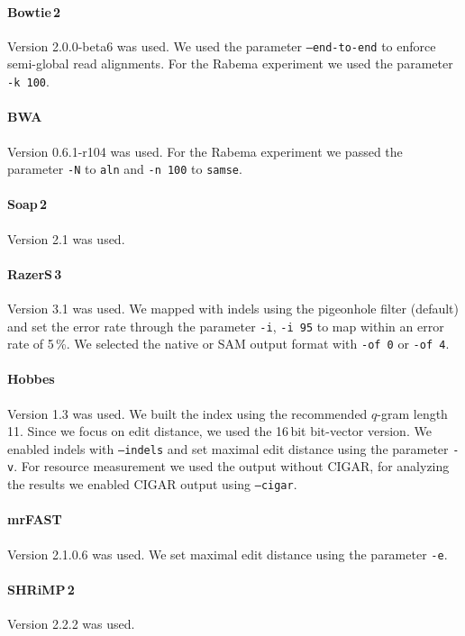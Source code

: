 \paragraph{Bowtie\,2}
Version 2.0.0-beta6 was used.
We used the parameter \texttt{--end-to-end} to enforce semi-global read alignments.
For the Rabema experiment we used the parameter \texttt{-k 100}.

\paragraph{BWA}
Version 0.6.1-r104 was used.
For the Rabema experiment we passed the parameter \texttt{-N} to \texttt{aln} and \texttt{-n 100} to \texttt{samse}.

\paragraph{Soap\,2}
Version 2.1 was used.

\paragraph{RazerS\,3}
Version 3.1 was used.
We mapped with indels using the pigeonhole filter (default) and set the error rate through the parameter \texttt{-i}, \eg \texttt{-i 95} to map within an error rate of 5\,\%.
We selected the native or SAM output format with \texttt{-of 0} or \texttt{-of 4}.

\paragraph{Hobbes}
Version 1.3 was used.
We built the index using the recommended $q$-gram length 11.
Since we focus on edit distance, we used the 16\,bit bit-vector version.
We enabled indels with \texttt{--indels} and set maximal edit distance using the parameter \texttt{-v}.
For resource measurement we used the output without CIGAR, for analyzing the results we enabled CIGAR output using \texttt{--cigar}.

\paragraph{mrFAST}
Version 2.1.0.6 was used.
We set maximal edit distance using the parameter \texttt{-e}.

\paragraph{SHRiMP\,2}
Version 2.2.2 was used.

